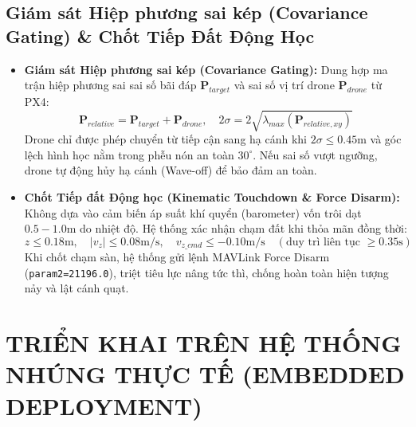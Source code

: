 \documentclass[12pt,a4paper]{article}
\begin{document}
\subsection{Giám sát Hiệp phương sai kép (Covariance Gating) \& Chốt Tiếp Đất Động Học}
\begin{itemize}[noitemsep,topsep=2pt]
    \item \textbf{Giám sát Hiệp phương sai kép (Covariance Gating):}
    Dung hợp ma trận hiệp phương sai sai số bãi đáp $\mathbf{P}_{target}$ và sai số vị trí drone $\mathbf{P}_{drone}$ từ PX4:
    \begin{equation}
        \mathbf{P}_{relative} = \mathbf{P}_{target} + \mathbf{P}_{drone}, \quad 2\sigma = 2\sqrt{\lambda_{max}(\mathbf{P}_{relative, xy})}
    \end{equation}
    Drone chỉ được phép chuyển từ tiếp cận sang hạ cánh khi $2\sigma \le 0.45\text{m}$ và góc lệch hình học nằm trong phễu nón an toàn $30^\circ$. Nếu sai số vượt ngưỡng, drone tự động hủy hạ cánh (Wave-off) để bảo đảm an toàn.
    
    \item \textbf{Chốt Tiếp đất Động học (Kinematic Touchdown \& Force Disarm):}
    Không dựa vào cảm biến áp suất khí quyển (barometer) vốn trôi dạt $0.5 - 1.0\text{m}$ do nhiệt độ. Hệ thống xác nhận chạm đất khi thỏa mãn đồng thời:
    \begin{equation}
        z \le 0.18\text{m}, \quad |v_z| \le 0.08\text{m/s}, \quad v_{z\_cmd} \le -0.10\text{m/s} \quad (\text{duy trì liên tục } \ge 0.35\text{s})
    \end{equation}
    Khi chốt chạm sàn, hệ thống gửi lệnh MAVLink Force Disarm (\texttt{param2=21196.0}), triệt tiêu lực nâng tức thì, chống hoàn toàn hiện tượng nảy và lật cánh quạt.
\end{itemize}

\section{TRIỂN KHAI TRÊN HỆ THỐNG NHÚNG THỰC TẾ (EMBEDDED DEPLOYMENT)}
\end{document}

